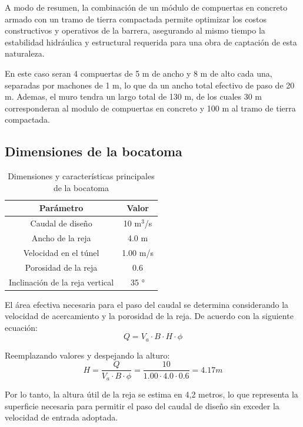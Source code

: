 \documentclass{article} %
\begin{document}
A modo de resumen, la combinación de un módulo de compuertas en concreto armado con un tramo de tierra compactada permite optimizar los costos constructivos y operativos de la barrera, asegurando al mismo tiempo la estabilidad hidráulica y estructural requerida para una obra de captación de esta naturaleza.

En este caso seran 4 compuertas de 5 m de ancho y 8 m de alto cada una, separadas por machones de 1 m, lo que da un ancho total efectivo de paso de 20 m. Ademas, el muro tendra un largo total de 130 m, de los cuales 30 m corresponderan al modulo de compuertas en concreto y 100 m al tramo de tierra compactada.


\subsection{Dimensiones de la bocatoma}
\begin{table}
    \centering
    \begin{tabular}{c c}
        \textbf{Parámetro} & \textbf{Valor} \\
        \hline
        Caudal de diseño & 10 m$^3$/s \\ 
        Ancho de la reja & 4.0 m \\
        Velocidad en el túnel & 1.00 m/s \\
        Porosidad de la reja & 0.6 \\
        Inclinación de la reja vertical & 35 ° \\ \hline
    \end{tabular}
    \caption{Dimensiones y características principales de la bocatoma}
\end{table}

El área efectiva necesaria para el paso del caudal se determina considerando la velocidad de acercamiento y la porosidad de la reja.
De acuerdo con la siguiente ecuación:
\begin{equation}
    Q = V_a \cdot B \cdot H \cdot \phi
\end{equation}

Reemplazando valores y despejando la alturo:
\begin{equation}
    H = \frac{Q}{V_a \cdot B \cdot \phi} = \frac{10}{1.00 \cdot 4.0 \cdot 0.6} = 4.17 m
\end{equation}

Por lo tanto, la altura útil de la reja se estima en 4,2 metros, lo que representa la superficie necesaria para permitir el paso del caudal de diseño sin exceder la velocidad de entrada adoptada.
\end{document}
